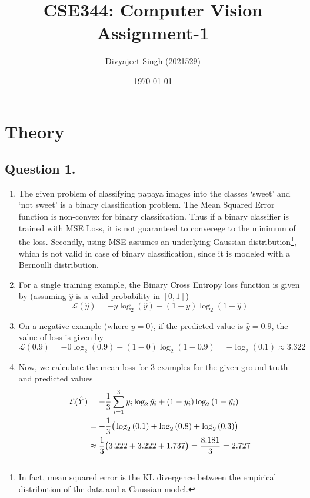 \documentclass[10pt]{article}
\title{
    \textbf{CSE344: Computer Vision} \\ \vspace*{-5pt}
    \textbf{\large{Assignment-1}}
}
\author{\href{mailto:divyajeet21529@iiitd.ac.in}{Divyajeet Singh (2021529)}}
\date{\today}
\begin{document}
    \maketitle

    \section*{\textbf{Theory}}

    \subsection*{\textbf{Question 1.}}
    \begin{enumerate}[label=(\alph*)]
        \item The given problem of classifying papaya images into the classes `sweet'
        and `not sweet' is a binary classification problem. The Mean Squared Error function
        is non-convex for binary classifcation. Thus if a binary classifier is
        trained with MSE Loss, it is not guaranteed to converege to the minimum of the loss.
        Secondly, using MSE assumes an underlying Gaussian distribution\footnote{
        In fact, mean squared error is the KL divergence between the empirical distribution of
        the data and a Gaussian model.},
        which is not valid in case of binary classification, since it is modeled with a
        Bernoulli distribution.

        \item For a single training example, the Binary Cross Entropy loss function
        is given by (assuming $\hat{y}$ is a valid probability in $[0, 1]$)
        \begin{equation*}
            \mathcal{L}(\hat{y}) = - y \log_{2}{(\hat{y})} - (1 - y) \log_{2}{(1 - \hat{y})}
        \end{equation*}

        \item On a negative example (where $y = 0$), if the predicted value is $\hat{y} = 0.9$,
        the value of loss is given by
        \begin{equation*}
            \mathcal{L}(0.9) = - 0 \log_{2}{(0.9)} - (1 - 0) \log_{2}{(1 - 0.9)}
            = - \log_{2}{(0.1)} \approx 3.322
        \end{equation*}

        \item Now, we calculate the mean loss for 3 examples for the given ground truth
        and predicted values
        \begin{align*}
            \mathcal{L}(\hat{Y}) &= - \frac{1}{3} \sum_{i=1}^{3} y_{i} \log_{2}{\hat{y_{i}}} +
            (1 - y_{i}) \log_{2}{(1 - \hat{y_{i}})} \\
            &= - \frac{1}{3} \big{(} \log_{2}{(0.1)} + \log_{2}{(0.8)} + \log_{2}{(0.3)} \big{)} \\
            &\approx \frac{1}{3} \big{(} 3.222 + 3.222 + 1.737 \big{)} = \frac{8.181}{3} = 2.727
        \end{align*}


\end{enumerate}
\end{document}
